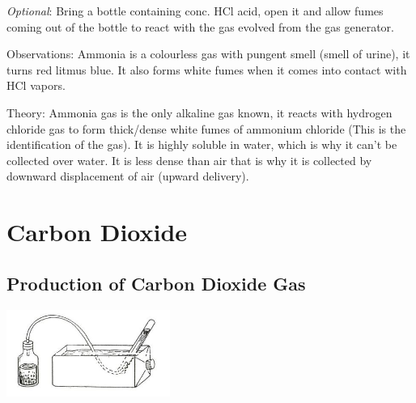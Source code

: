 \begin{multicols}{2}
\begin{description*}
{\emph{Optional}: Bring a bottle containing conc. HCl acid, open it and allow
fumes coming out of the bottle to react with the gas evolved from the
gas generator.}
\item[Observations:]{Ammonia is a colourless gas with pungent smell (smell of urine), it turns red
litmus blue. It also forms white fumes when it comes into contact with HCl
vapors.}
\item[Theory:]{Ammonia gas is the only alkaline gas known, it reacts with hydrogen
chloride gas to form thick/dense white fumes of ammonium chloride (This
is the identification of the gas). It is highly soluble in water, which is why
it can't be collected over water. It is less dense than air that is why it is
collected by downward displacement of air (upward delivery).}
\end{description*}


\section*{Carbon Dioxide}


\subsection{Production of Carbon Dioxide Gas} %

\begin{center}
\includegraphics[width=0.4\textwidth]{./img/source/co2-generator.jpg}
\end{center}


\end{multicols}
